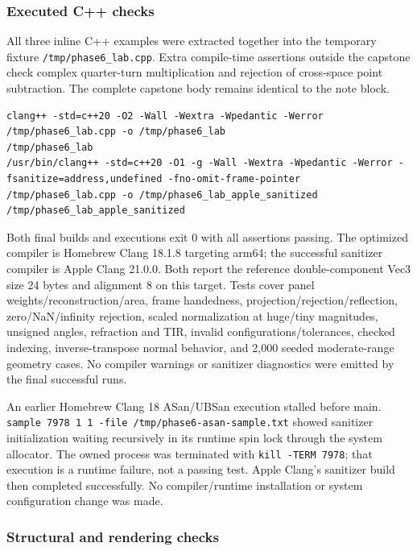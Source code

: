 \subsubsection{Executed C++ checks}\label{appendix-a103e7846d21-executed-c-checks}

\hypertarget{appendix-a103e7846d21-executed-c-checks}{}

All three inline C++ examples were extracted together into the temporary fixture \texttt{/tmp/phase6\_lab.cpp}. Extra compile-time assertions outside the capstone check complex quarter-turn multiplication and rejection of cross-space point subtraction. The complete capstone body remains identical to the note block.

\begin{verbatim}
clang++ -std=c++20 -O2 -Wall -Wextra -Wpedantic -Werror /tmp/phase6_lab.cpp -o /tmp/phase6_lab
/tmp/phase6_lab
/usr/bin/clang++ -std=c++20 -O1 -g -Wall -Wextra -Wpedantic -Werror -fsanitize=address,undefined -fno-omit-frame-pointer /tmp/phase6_lab.cpp -o /tmp/phase6_lab_apple_sanitized
/tmp/phase6_lab_apple_sanitized
\end{verbatim}

Both final builds and executions exit 0 with all assertions passing. The optimized compiler is Homebrew Clang 18.1.8 targeting arm64; the successful sanitizer compiler is Apple Clang 21.0.0. Both report the reference double-component Vec3 size 24 bytes and alignment 8 on this target. Tests cover panel weights/reconstruction/area, frame handedness, projection/rejection/reflection, zero/NaN/infinity rejection, scaled normalization at huge/tiny magnitudes, unsigned angles, refraction and TIR, invalid configurations/tolerances, checked indexing, inverse-transpose normal behavior, and 2,000 seeded moderate-range geometry cases. No compiler warnings or sanitizer diagnostics were emitted by the final successful runs.

An earlier Homebrew Clang 18 ASan/UBSan execution stalled before main. \texttt{sample\ 7978\ 1\ 1\ -file\ /tmp/phase6-asan-sample.txt} showed sanitizer initialization waiting recursively in its runtime spin lock through the system allocator. The owned process was terminated with \texttt{kill\ -TERM\ 7978}; that execution is a runtime failure, not a passing test. Apple Clang's sanitizer build then completed successfully. No compiler/runtime installation or system configuration change was made.

\subsubsection{Structural and rendering checks}\label{appendix-a103e7846d21-structural-and-rendering-checks}

